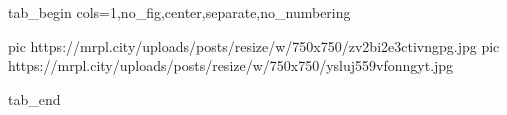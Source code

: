  
 
 
 
 

\ifcmt
  tab_begin cols=1,no_fig,center,separate,no_numbering

     pic https://mrpl.city/uploads/posts/resize/w/750x750/zv2bi2e3ctivngpg.jpg
     pic https://mrpl.city/uploads/posts/resize/w/750x750/ysluj559vfonngyt.jpg

  tab_end
\fi
